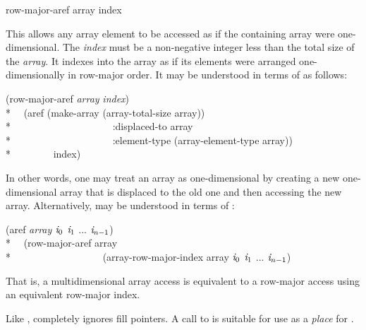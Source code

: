 \begin{defun}[Function]
row-major-aref array index

This allows any array element to be accessed as if the containing array
were one-dimensional.  The \emph{index} must be a non-negative integer
less than the total size of the \emph{array}.  It indexes into the array as
if its elements were arranged one-dimensionally in row-major order.
It may be understood in terms of  as follows:
\begin{lisp}
(row-major-aref \emph{array} \emph{index}) \EQ \\*
~~(aref (make-array (array-total-size array)) \\*
~~~~~~~~~~~~~~~~~~~~:displaced-to array \\*
~~~~~~~~~~~~~~~~~~~~:element-type (array-element-type array)) \\*
~~~~~~~~index)
\end{lisp}
In other words, one may treat an array as one-dimensional by creating
a new one-dimensional array that is displaced to the old one and then
accessing the new array.
Alternatively,  may be understood in terms of :
\begin{lisp}
(aref \emph{array} $\emph{i}_0$ $\emph{i}_1$ ... $\emph{i}_{n-1}$) \EQ \\*
~~(row-major-aref array \\*
~~~~~~~~~~~~~~~~~~(array-row-major-index array $\emph{i}_0$ $\emph{i}_1$ ... $\emph{i}_{n-1}$)
\end{lisp}
That is, a multidimensional array access is equivalent to a row-major access
using an equivalent row-major index.

Like ,  completely ignores fill pointers.
A call to  is suitable for use as a \emph{place} for
.


\end{defun}
